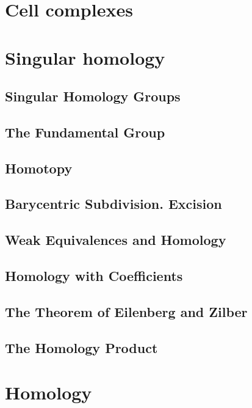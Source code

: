 \documentclass[11pt]{book} %
\begin{document}
\chapter{Cell complexes}




\chapter{Singular homology}
\section{Singular Homology Groups}
\section{The Fundamental Group
}

\section{Homotopy
}
\section{Barycentric Subdivision. Excision}
\section{Weak Equivalences and Homology}
\section{Homology with Coefficients}
\section{The Theorem of Eilenberg and Zilber}
\section{The Homology Product}
\chapter{Homology}
\end{document}
